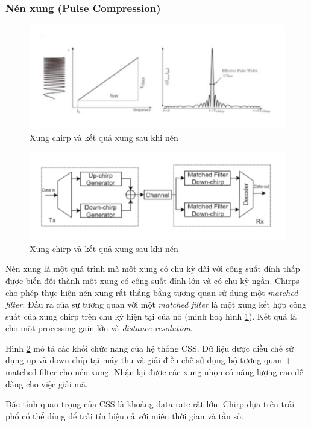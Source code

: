 \subsubsection{Nén xung (Pulse Compression)}
	\begin{figure}[h!] %
			\centering
			\includegraphics[width=0.8\linewidth]{./img/25.pdf}
			\caption{Xung chirp và kết quả xung sau khi nén}
			\label{fig:fig25}
	\end{figure}
		\begin{figure}[h!] %
			\centering
			\includegraphics[width=0.8\linewidth]{./img/26.pdf}
			\caption{Xung chirp và kết quả xung sau khi nén}
			\label{fig:fig26}
	\end{figure}
Nén xung là một quá trình mà một xung có chu kỳ dài với công suất đỉnh thấp được biến đổi thành một xung có công suất đỉnh lớn và có chu kỳ ngắn. Chirps cho phép thực hiện nén xung rất thẳng bằng tương quan sử dụng một \textit{matched filter}. Đầu ra của sự tương quan với một \textit{matched filter} là một xung kết hợp  công suất của xung chirp trên chu kỳ hiện tại của nó (minh hoạ hình \ref{fig:fig25}). Kết quả là cho một processing gain lớn và \textit{distance resolution}. \par 

Hình \ref{fig:fig26} mô tả các khối chức năng của hệ thống CSS. Dữ liệu được điều chế sử dụng up và down chíp tại máy thu và giải điều chế sử dụng bộ tương quan + matched filter cho nén xung. Nhận lại được các xung nhọn có năng lượng cao dễ dàng cho việc giải mã. \par 
Đặc tính quan trọng của CSS là khoảng data rate rất lớn. Chirp dựa trên trải phổ có thể dùng để trải tín hiệu cả với miền thời gian và tần số.

